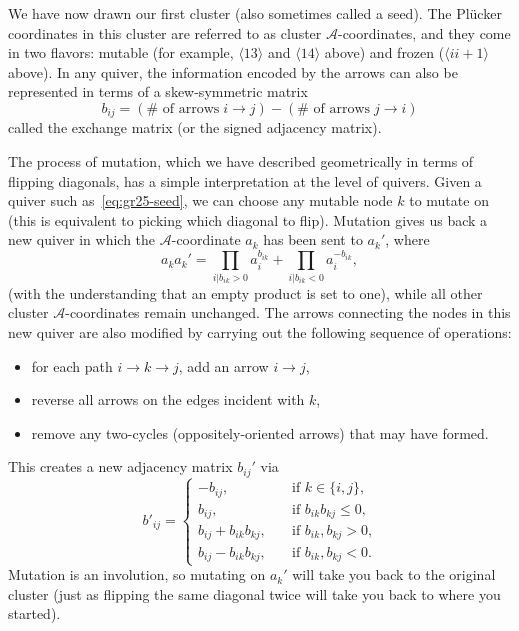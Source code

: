 \documentclass[12pt]{article}
\def\ket#1{\langle #1 \rangle}
\def\a{\mathcal{A}}
\begin{document}
We have now drawn our first cluster (also sometimes called a seed). The Pl\"ucker coordinates in this cluster are referred to as cluster $\a$-coordinates, and they come in two flavors: mutable (for example, $\ket{13}$ and $\ket{14}$ above) and frozen ($\ket{ii+1}$ above). In any quiver, the information encoded by the arrows can also be represented in terms of a skew-symmetric matrix
\begin{equation}
b_{i j} = (\# \text{ of arrows}\; i \to j) - (\# \text{ of arrows}\; j \to i)
\label{eq:bijdef}
\end{equation}
called the exchange matrix (or the signed adjacency matrix).

The process of mutation, which we have described geometrically in terms of flipping diagonals, has a simple interpretation at the level of quivers. Given a quiver such as~\eqref{eq:gr25-seed}, we can choose any mutable node $k$ to mutate on (this is equivalent to picking which diagonal to flip). Mutation gives us back a new quiver in which the $\a$-coordinate $a_{k}$ has been sent to $a_{k}'$, where 
\begin{equation}
  \label{eq:a-coord-mutation}
  a_{k} a_{k}' = \prod_{i \vert b_{i k} > 0} a_{i}^{b_{i k}} + \prod_{i \vert b_{i k} < 0} a_{i}^{-b_{i k}},
\end{equation} (with the understanding that an empty product is set to one), while all other cluster $\a$-coordinates remain unchanged. The arrows connecting the nodes in this new quiver are also modified by carrying out the following sequence of operations:
\begin{itemize}
	\item for each path $i\to k \to j$, add an arrow $i\to j$,
	\item reverse all arrows on the edges incident with $k$,
	\item remove any two-cycles (oppositely-oriented arrows) that may have formed.
\end{itemize}
This creates a new adjacency matrix $b_{ij}'$ via 
\begin{equation}
  \label{eq:b-mutation}
  b'_{i j} =
  \begin{cases}
    -b_{i j}, &\quad \text{if $k \in \lbrace i, j\rbrace$,}\\
    b_{i j}, &\quad \text{if $b_{i k} b_{k j} \leq 0$,}\\
    b_{i j} + b_{i k} b_{k j}, &\quad \text{if $b_{i k}, b_{k j} > 0$,}\\
    b_{i j} - b_{i k} b_{k j}, &\quad \text{if $b_{i k}, b_{k j} < 0$.}
  \end{cases}
\end{equation}
Mutation is an involution, so mutating on $a_k'$ will take you back to the original cluster (just as flipping the same diagonal twice will take you back to where you started). 
\end{document}
